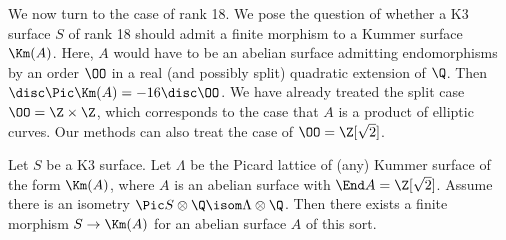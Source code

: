 \documentclass{article}
\begin{document}
We now turn to the case of rank 18.  We pose the question of whether a K3 surface $S$ of rank 18 should admit a finite morphism to a Kummer surface $\Km(A)$.  Here, $A$ would have to be an abelian surface admitting endomorphisms by an order $\OO$ in a real (and possibly split) quadratic extension of $\Q$.   Then $\disc \Pic \Km(A)=-16\disc \OO$.  We have already treated the split case $\OO=\Z\times \Z$, which corresponds to the case that $A$ is a product of elliptic curves.   Our methods can also treat the case of $\OO=\Z[\sqrt{2}]$.  

\begin{prop}  Let $S$ be a K3 surface.  Let $\Lambda$ be the Picard lattice of (any) Kummer surface of the form $\Km(A)$, where $A$ is an abelian surface with $\End A = \Z[\sqrt{2}]$.   Assume there is an isometry $\Pic S\otimes\Q\isom \Lambda\otimes\Q$.  Then there exists a finite morphism $S\to\Km(A)$ for an abelian surface $A$ of this sort.
\end{prop}
\end{document}
